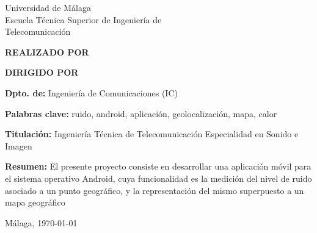 
\thispagestyle{empty}
\begin{spacing}{1}

\begin{center}
	\Large \sffamily
	Universidad de Málaga\\
	Escuela Técnica Superior de Ingeniería de\\
	Telecomunicación
\end{center}

\bigskip

\begin{center}
	\Huge\scshape
	\pfctitlename
\end{center}

\bigskip

\begin{center}
	\textbf{REALIZADO POR}\\
	\textsf{\pfcauthorname}
\end{center}

\medskip

\begin{center}
	\textbf{DIRIGIDO POR}\\
	\textsf{\pfctutorname}
\end{center}

\vfill

\begin{minipage}{\textwidth}
\textbf{Dpto. de:} Ingeniería de Comunicaciones (IC)

\medskip

\textbf{Palabras clave:} ruido, android, aplicación, geolocalización, mapa, calor

\medskip

\textbf{Titulación:} Ingeniería Técnica de Telecomunicación Especialidad en Sonido e Imagen

\medskip

\textbf{Resumen:}
	El presente proyecto consiste en desarrollar una aplicación móvil para el sistema operativo Android, cuya funcionalidad es la medición del nivel de ruido asociado a un punto geográfico, y la representación del mismo superpuesto a un mapa geográfico

\begin{center} Málaga, \today\end{center}
\end{minipage}
\end{spacing}
\blankpage
